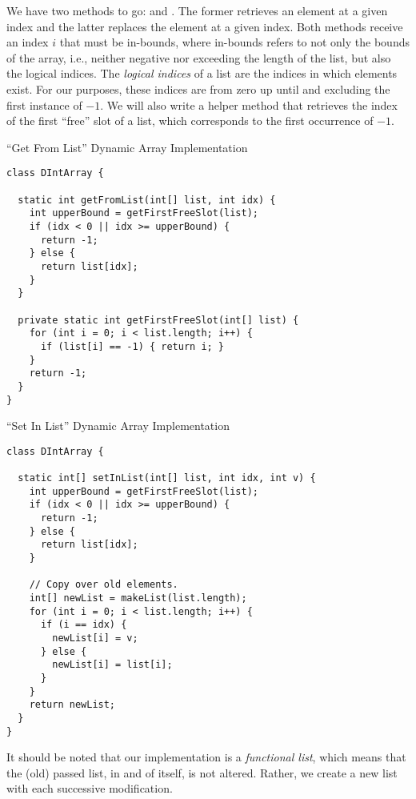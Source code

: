 We have two methods to go:  and . The former retrieves an element at a given index and the latter replaces the element at a given index. Both methods receive an index $i$ that must be in-bounds, where in-bounds refers to not only the bounds of the array, i.e., neither negative nor exceeding the length of the list, but also the logical indices. The \textit{logical indices} of a list are the indices in which elements exist. For our purposes, these indices are from zero up until and excluding the first instance of $-1$. We will also write a helper method that retrieves the index of the first ``free'' slot of a list, which corresponds to the first occurrence of $-1$.

\begin{cl}{``Get From List'' Dynamic Array Implementation}
\begin{lstlisting}[language=MyJava]
class DIntArray {

  static int getFromList(int[] list, int idx) {
    int upperBound = getFirstFreeSlot(list);
    if (idx < 0 || idx >= upperBound) {
      return -1;
    } else {
      return list[idx];
    }
  }

  private static int getFirstFreeSlot(int[] list) {
    for (int i = 0; i < list.length; i++) {
      if (list[i] == -1) { return i; }
    }
    return -1;
  }
}
\end{lstlisting}
\end{cl}

\begin{cl}{``Set In List'' Dynamic Array Implementation}
\begin{lstlisting}[language=MyJava]
class DIntArray {

  static int[] setInList(int[] list, int idx, int v) {
    int upperBound = getFirstFreeSlot(list);
    if (idx < 0 || idx >= upperBound) {
      return -1;
    } else {
      return list[idx];
    }

    // Copy over old elements.
    int[] newList = makeList(list.length);
    for (int i = 0; i < list.length; i++) {
      if (i == idx) {
        newList[i] = v;
      } else {
        newList[i] = list[i];
      }
    }
    return newList;
  }
}
\end{lstlisting}
\end{cl}

It should be noted that our implementation is a \textit{functional list}, which means that the (old) passed list, in and of itself, is not altered. Rather, we create a new list with each successive modification.

